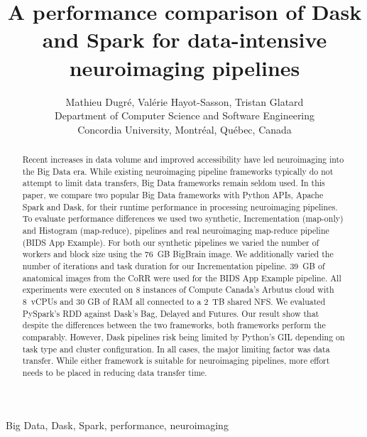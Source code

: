 \documentclass[conference]{IEEEtran}
\begin{document}
\title{A performance comparison of Dask and Spark for data-intensive neuroimaging pipelines}

\author{Mathieu Dugr\'e, Val\'erie Hayot-Sasson, Tristan Glatard\\
Department of Computer Science and Software Engineering\\
Concordia University, Montr\'eal, Qu\'ebec, Canada
}

\maketitle

\begin{abstract}
Recent increases in data volume and improved accessibility have 
led neuroimaging into the Big Data era. 
While existing neuroimaging pipeline frameworks typically do not attempt to
limit data transfers, Big Data frameworks remain seldom used.
In this paper, we compare two popular Big Data frameworks with Python APIs,
Apache Spark and Dask, for their runtime performance in processing neuroimaging
pipelines.
To evaluate performance differences we used two synthetic, Incrementation
(map-only) and Histogram (map-reduce), pipelines and real neuroimaging map-reduce pipeline (BIDS App Example). For both our 
synthetic pipelines we varied the number of workers and block size using the 
76~GB BigBrain image. We additionally varied the number of iterations and task
duration for our Incrementation pipeline. 39~GB of anatomical images from the
CoRR were used for the BIDS App Example pipeline.
All experiments were executed on 8 instances of Compute Canada's Arbutus cloud
with 8~vCPUs and 30 GB of RAM all connected to a 2~TB shared NFS. We evaluated
PySpark's RDD against Dask's Bag, Delayed and Futures.
Our result show that despite the differences between the two frameworks, both
frameworks perform the comparably. However, Dask pipelines risk being limited by
Python's GIL depending on task type and cluster configuration. In all cases, 
the major limiting factor was data transfer. While either framework is suitable
for neuroimaging pipelines, more effort needs to be placed in reducing data 
transfer time.
\end{abstract}

\begin{IEEEkeywords}
Big Data, Dask, Spark, performance, neuroimaging
\end{IEEEkeywords}
\end{document}
